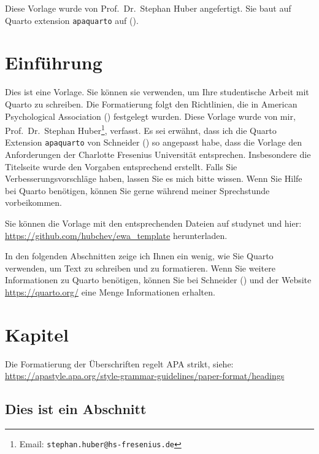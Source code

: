 \documentclass[
  stu,
  floatsintext,
  longtable,
  a4paper,
  nolmodern,
  notxfonts,
  notimes,
  donotrepeattitle,
  colorlinks=true,linkcolor=blue,citecolor=blue,urlcolor=blue]{apa7}
\begin{document}
\noindent  Diese Vorlage wurde von Prof.~Dr.~Stephan Huber angefertigt.
Sie baut auf Quarto extension \texttt{apaquarto} auf
().

\newpage
\thispagestyle{empty}
\tableofcontents

\newpage

\section{Einführung}\label{einfuxfchrung}

Dies ist eine Vorlage. Sie können sie verwenden, um Ihre studentische
Arbeit mit Quarto zu schreiben. Die Formatierung folgt den Richtlinien,
die in American Psychological Association
() festgelegt wurden. Diese
Vorlage wurde von mir, Prof.~Dr.~Stephan Huber\footnote{Email:
  \texttt{stephan.huber@hs-fresenius.de}}, verfasst. Es sei erwähnt,
dass ich die Quarto Extension \texttt{apaquarto} von Schneider
() so angepasst habe, dass die
Vorlage den Anforderungen der Charlotte Fresenius Universität
entsprechen. Insbesondere die Titelseite wurde den Vorgaben entsprechend
erstellt. Falls Sie Verbesserungsvorschläge haben, lassen Sie es mich
bitte wissen. Wenn Sie Hilfe bei Quarto benötigen, können Sie gerne
während meiner Sprechstunde vorbeikommen.

Sie können die Vorlage mit den entsprechenden Dateien auf studynet und
hier: \url{https://github.com/hubchev/ewa_template} herunterladen.

In den folgenden Abschnitten zeige ich Ihnen ein wenig, wie Sie Quarto
verwenden, um Text zu schreiben und zu formatieren. Wenn Sie weitere
Informationen zu Quarto benötigen, können Sie bei Schneider
() und der Website
\url{https://quarto.org/} eine Menge Informationen erhalten.

\section{Kapitel}\label{kapitel}

Die Formatierung der Überschriften regelt APA strikt, siehe:
\url{https://apastyle.apa.org/style-grammar-guidelines/paper-format/headings}

\subsection{Dies ist ein Abschnitt}\label{dies-ist-ein-abschnitt}
\end{document}
